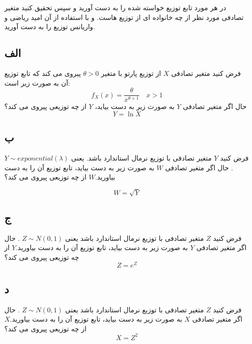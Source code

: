 
در هر مورد تابع توزیع خواسته شده را به دست آورید و سپس تحقیق کنید متغیر تصادفی مورد نظر از چه خانواده ای از توزیع هاست. و با استفاده از آن امید ریاضی و واریانس توزیع را به دست آورید.
\subsection*{الف}
فرض کنید متغیر تصادفی $X$ از توزیع پارتو با متغیر $\theta > 0$ پیروی می کند که تابع توزیع آن به صورت زیر است:
$$f_{X}(x) = \frac{\theta}{x ^ {\theta + 1}} \quad x > 1$$
حال اگر متغیر تصادفی $Y$ به صورت زیر به دست بیاید، $Y$ از چه توزیعی پیروی می کند؟
$$ Y = \ln X$$

\subsection*{ب}
فرض کنید $Y$ متغیر تصادفی با توزیع نرمال استاندارد باشد. یعنی $Y \sim exponential(\lambda)$. حال اگر متغیر تصادفی $W$ به صورت زیر به دست بیاید، تابع توزیع آن را به دست بیاورید.$W$ از چه توزیعی پیروی می کند؟

$$W = \sqrt{Y}$$
\subsection*{ج}
فرض کنید $Z$ متغیر تصادفی با توزیع نرمال استاندارد باشد یعنی $Z \sim N(0, 1)$ . حال اگر متغیر تصادفی $Y$ به صورت زیر به دست بیاید، تابع توزیع آن را به دست بیاورید.$Y$ از چه توزیعی پیروی می کند؟
$$Z = e ^ Z$$
\subsection*{د}
فرض کنید $Z$ متغیر تصادفی با توزیع نرمال استاندارد باشد یعنی $Z \sim N(0, 1)$ . حال اگر متغیر تصادفی $X$ به صورت زیر به دست بیاید، تابع توزیع آن را به دست بیاورید.$X$ از چه توزیعی پیروی می کند؟
$$X = Z ^ 2 $$
